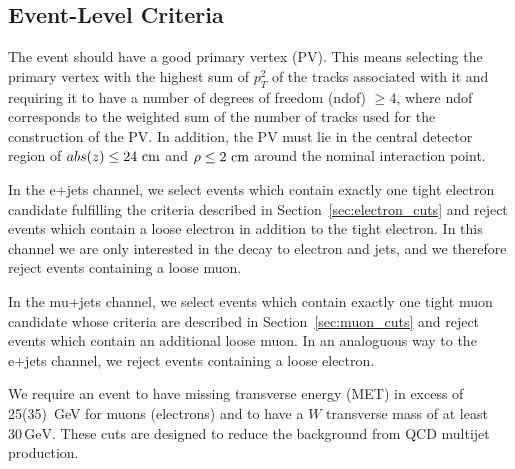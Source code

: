 \subsection{Event-Level Criteria}

The event should have a good primary vertex (PV). This means selecting
the primary vertex with the highest sum of $p_{T}^2$ of the tracks
associated with it and requiring it to have a number of degrees of
freedom (ndof) $\ge 4$, where ndof corresponds to the weighted sum of
the number of tracks used for the construction of the PV. In addition,
the PV must lie in the central detector region of $abs(z) \le
24~\rm{cm}$ and $\rho \le 2~\rm{cm}$ around the nominal interaction
point.

In the e+jets channel, we select events which contain exactly one
tight electron candidate fulfilling the criteria described in
Section~\ref{sec:electron_cuts} and reject events which contain a
loose electron in addition to the tight electron. In this channel we
are only interested in the decay to electron and jets, and we
therefore reject events containing a loose muon.

In the mu+jets channel, we select events which contain exactly one
tight muon candidate whose criteria are described in
Section~\ref{sec:muon_cuts} and reject events which contain an
additional loose muon. In an analoguous way to the e+jets channel, we
reject events containing a loose electron.

We require an event to have missing transverse energy (MET) in excess
of 25(35)~GeV for muons (electrons) and to have a $W$ transverse mass
of at least $30\,\mathrm{GeV}$.  These cuts are designed to reduce the
background from QCD multijet production.


